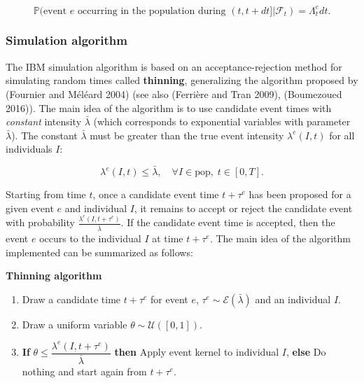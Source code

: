\begin{equation}
\mathbb{P}(\text{event } e \text{ occurring in the population during } (t,t+dt] | \mathcal{F}_t) = \Lambda^e_t dt.
\end{equation}

\hypertarget{algo}{%
\subsubsection{Simulation algorithm}\label{algo}}

The IBM simulation algorithm is based on an acceptance-rejection method for simulating random times called \textbf{thinning}, generalizing the algorithm proposed by (Fournier and Méléard 2004) (see also (Ferrière and Tran 2009), (Boumezoued 2016)).
The main idea of the algorithm is to use candidate event times with \emph{constant} intensity \(\bar \lambda\) (which corresponds to exponential variables with parameter \(\bar \lambda\)). The constant \(\bar \lambda\) must be greater than the true event intensity \(\lambda^e(I,t)\) for all individuals \(I\):

\begin{equation}
\lambda^e(I,t) \leq \bar{\lambda}, \quad \forall I \in \text{pop}, \; t \in [0,T].
\end{equation}

Starting from time \(t\), once a candidate event time \(t + \tau^e\) has been proposed for a given event \(e\) and individual \(I\), it remains to accept or reject the candidate event with probability \(\frac{\lambda^e(I,t+\tau^e)}{\bar{\lambda}}\). If the candidate event time is accepted, then the event \(e\) occurs to the individual \(I\) at time \(t + \tau^e\). The main idea of the algorithm implemented can be summarized as follows:

\textbf{Thinning algorithm}

\begin{enumerate}
\def\labelenumi{\arabic{enumi}.}
\tightlist
\item
  Draw a candidate time \(t+\tau^e\) for event \(e\), \(\tau^e \sim \mathcal E(\bar \lambda)\) and an individual \(I\).
\item
  Draw a uniform variable \(\theta \sim \mathcal U([0,1])\).
\item
  \textbf{If} \(\theta \leq \dfrac{\lambda^e(I,t+\tau^e)}{\bar\lambda}\) \textbf{then} Apply event kernel to individual \(I\),
  \textbf{else} Do nothing and start again from \(t+\tau^e\).
\end{enumerate}

